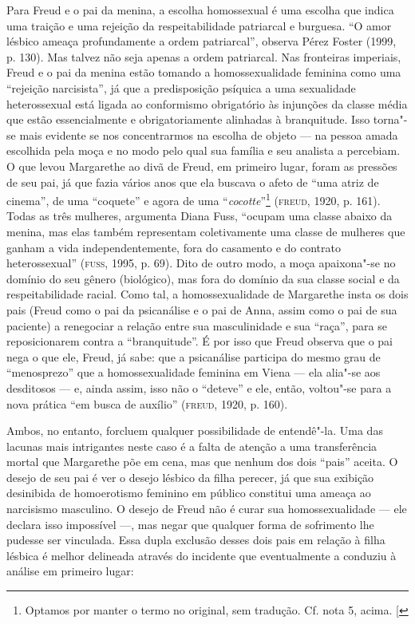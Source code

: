 Para Freud e o pai da menina, a escolha homossexual é uma escolha que
indica uma traição e uma rejeição da respeitabilidade patriarcal e
burguesa. ``O amor lésbico ameaça profundamente a ordem patriarcal'',
observa Pérez Foster (1999, p. 130). Mas talvez não seja
apenas a ordem patriarcal. Nas fronteiras imperiais, Freud e o pai da
menina estão tomando a homossexualidade feminina como uma ``rejeição
narcisista'', já que a predisposição psíquica a uma sexualidade
heterossexual está ligada ao conformismo obrigatório às injunções da
classe média que estão essencialmente e obrigatoriamente alinhadas à
branquitude. Isso torna"-se mais evidente se nos concentrarmos na escolha
de objeto --- na pessoa amada escolhida pela moça e no modo pelo qual sua
família e seu analista a percebiam. O que levou Margarethe ao divã de
Freud, em primeiro lugar, foram as pressões de seu pai, já que fazia
vários anos que ela buscava o afeto de ``uma atriz de cinema'', de uma
``coquete'' e agora de uma ``\emph{cocotte}''\footnote{Optamos por manter o
  termo no original, sem tradução. Cf. nota 5, acima. {[}\versal{N.~T.}{]}}
(\textsc{freud}, 1920, p. 161). Todas as três mulheres, argumenta Diana Fuss, ``ocupam
uma classe abaixo da menina, mas elas também representam coletivamente
uma classe de mulheres que ganham a vida independentemente, fora do
casamento e do contrato heterossexual'' (\textsc{fuss}, 1995, p. 69). Dito de outro
modo, a moça apaixona"-se no domínio do seu gênero (biológico), mas fora
do domínio da sua classe social e da respeitabilidade racial. Como tal,
a homossexualidade de Margarethe insta os dois pais (Freud como o pai da
psicanálise e o pai de Anna, assim como o pai de sua paciente) a
renegociar a relação entre sua masculinidade e sua ``raça'', para se
reposicionarem contra a ``branquitude''. É por isso que Freud observa que
o pai nega o que ele, Freud, já sabe: que a psicanálise participa do
mesmo grau de ``menosprezo'' que a homossexualidade feminina em Viena ---
ela alia"-se aos desditosos --- e, ainda assim, isso não o ``deteve'' e
ele, então, voltou"-se para a nova prática ``em busca de auxílio''
(\textsc{freud}, 1920, p. 160).

Ambos, no entanto, forcluem qualquer possibilidade de entendê"-la. Uma
das lacunas mais intrigantes neste caso é a falta de atenção a uma
transferência mortal que Margarethe põe em cena, mas que nenhum dos dois
``pais'' aceita. O desejo de seu pai é ver o desejo lésbico da filha
perecer, já que sua exibição desinibida de homoerotismo feminino em
público constitui uma ameaça ao narcisismo masculino. O desejo de Freud
não é curar sua homossexualidade --- ele declara isso impossível ---, mas
negar que qualquer forma de sofrimento lhe pudesse ser vinculada. Essa
dupla exclusão desses dois pais em relação à filha lésbica é melhor
delineada através do incidente que eventualmente a conduziu à análise em
primeiro lugar:

